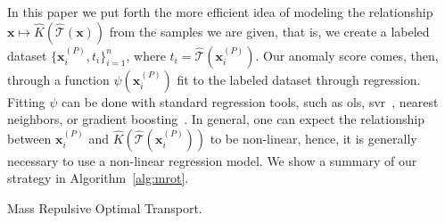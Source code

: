 \begin{minipage}[t]{0.48\textwidth}
In this paper we put forth the more efficient idea of modeling the relationship $\mathbf{x} \mapsto \hat{K}(\hat{\mathcal{T}}(\mathbf{x}))$ from the samples we are given, that is, we create a labeled dataset $\{\mathbf{x}_{i}^{(P)}, t_{i}\}_{i=1}^{n}$, where $t_{i} = \hat{\mathcal{T}}(\mathbf{x}_{i}^{(P)})$. Our anomaly score comes, then, through a function $\psi(\mathbf{x}_{i}^{(P)})$ fit to the labeled dataset through regression. Fitting $\psi$ can be done with standard regression tools, such as \gls{ols}, \gls{svr}~\citep{smola2004tutorial}, nearest neighbors, or gradient boosting~\citep{friedman2002stochastic}. In general, one can expect the relationship between $\mathbf{x}_{i}^{(P)}$ and $\hat{K}(\hat{\mathcal{T}}(\mathbf{x}_{i}^{(P)}))$ to be non-linear, hence, it is generally necessary to use a non-linear regression model. We show a summary of our strategy in Algorithm~\ref{alg:mrot}.
\end{minipage}
\hfill
\begin{minipage}[t]{0.48\textwidth}
\begin{algorithm}[H]
  \caption{Mass Repulsive Optimal Transport.}
  \label{alg:mrot}
\end{algorithm}
\end{minipage}
